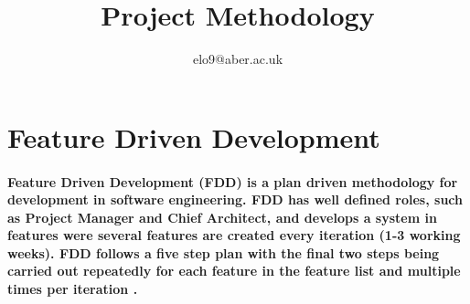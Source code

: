 \documentclass{article}
\title{Project Methodology}
\author{elo9@aber.ac.uk}
\begin{document}
\maketitle
\tableofcontents

\newpage

\section{Feature Driven Development}
\paragraph{Feature Driven Development (FDD) is a plan driven methodology for development in software engineering. FDD has well defined roles, such as Project Manager and Chief Architect, and develops a system in features were several features are created every iteration (1-3 working weeks). FDD follows a five step plan with the final two steps being carried out repeatedly for each feature in the feature list and multiple times per iteration \cite{FDDandAgile}.}
\end{document}
